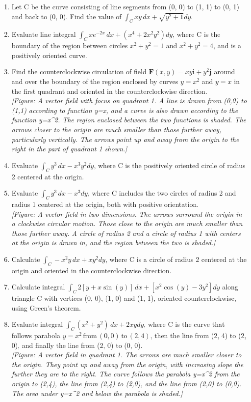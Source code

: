 \documentclass{exercises}
\begin{document}
\begin{enumerate}[resume]
\item Let C be the curve consisting of line segments from (0, 0) to (1, 1) to (0, 1) and back to (0, 0). Find the value of $\int_{C}xy\,dx+\sqrt{y^{2}+1}dy$.
\item Evaluate line integral $\int_{C}xe^{-2x}\,dx+(x^{4}+2x^{2}y^{2})dy$, where C is the boundary of the region between circles $x^{2}+y^{2}=1$ and $x^{2}+y^{2}=4$, and is a positively oriented curve.
\item Find the counterclockwise circulation of field $\mathbf{F}(x,y)=xy\mathbf{i}+y^{2}\mathbf{j}$ around and over the boundary of the region enclosed by curves $y=x^{2}$ and $y=x$ in the first quadrant and oriented in the counterclockwise direction. \\ \textit{[Figure: A vector field with focus on quadrant 1. A line is drawn from (0,0) to (1,1) according to function y=x, and a curve is also drawn according to the function y=x\textasciicircum{}2. The region enclosed between the two functions is shaded. The arrows closer to the origin are much smaller than those further away, particularly vertically. The arrows point up and away from the origin to the right in the part of quadrant 1 shown.]}
\item Evaluate $\int_{C}y^{3}\,dx-x^{3}y^{2}dy$, where C is the positively oriented circle of radius 2 centered at the origin.
\item Evaluate $\int_{C}y^{3}\,dx-x^{3}dy$, where C includes the two circles of radius 2 and radius 1 centered at the origin, both with positive orientation. \\ \textit{[Figure: A vector field in two dimensions. The arrows surround the origin in a clockwise circular motion. Those close to the origin are much smaller than those further away. A circle of radius 2 and a circle of radius 1 with centers at the origin is drawn in, and the region between the two is shaded.]}
\item Calculate $\int_{C}-x^{2}y\,dx+xy^{2}dy$, where C is a circle of radius 2 centered at the origin and oriented in the counterclockwise direction.
\item Calculate integral $\int_{C}2[y+x\sin(y)]\,dx+[x^{2}\cos(y)-3y^{2}]dy$ along triangle C with vertices (0, 0), (1, 0) and (1, 1), oriented counterclockwise, using Green's theorem.
\item Evaluate integral $\int_{C}(x^{2}+y^{2})\,dx+2xydy$, where C is the curve that follows parabola $y=x^{2}\,\text{from}\,(0,0)\,\text{to}\,(2,4)$, then the line from (2, 4) to (2, 0), and finally the line from (2, 0) to (0, 0). \\ \textit{[Figure: A vector field in quadrant 1. The arrows are much smaller closer to the origin. They point up and away from the origin, with increasing slope the further they are to the right. The curve follows the parabola y=x\textasciicircum{}2 from the origin to (2,4), the line from (2,4) to (2,0), and the line from (2,0) to (0,0). The area under y=x\textasciicircum{}2 and below the parabola is shaded.]}

\end{enumerate}
\end{document}
